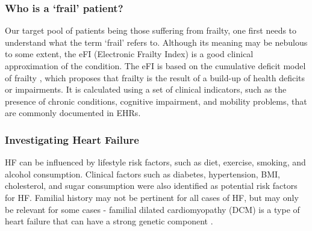 \documentclass[%
 reprint,
 amsmath,amssymb,
 aps,
 nofootinbib,
]{revtex4-2}
\theoremstyle{definition}
\begin{document}
\subsubsection{\label{frail}Who is a `frail' patient?}
Our target pool of patients being those suffering from frailty, one first needs to understand what the term `frail' refers to. Although its meaning may be nebulous to some extent, the eFI (Electronic Frailty Index) is a good clinical approximation of the condition. The eFI is based on the cumulative deficit model of frailty \citep{england_nhs_efi}, which proposes that frailty is the result of a build-up of health deficits or impairments. It is calculated using a set of clinical indicators, such as the presence of chronic conditions, cognitive impairment, and mobility problems, that are commonly documented in EHRs.
\subsubsection{\label{hf}Investigating Heart Failure}
HF can be influenced by lifestyle risk factors, such as diet, exercise, smoking, and alcohol consumption. Clinical factors such as diabetes, hypertension, BMI, cholesterol, and sugar consumption were also identified as potential risk factors for HF. Familial history may not be pertinent for all cases of HF, but may only be relevant for some cases - familial dilated cardiomyopathy (DCM) is a type of heart failure that can have a strong genetic component \citep{peters2020familial}.
\end{document}
